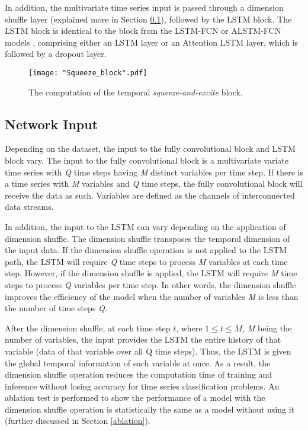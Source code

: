 \documentclass[preprint,12pt,3p]{elsarticle}
\begin{document}
In addition, the multivariate time series input is passed through a dimension shuffle layer (explained more in Section \ref{net_input}), followed by the LSTM block. The LSTM block is identical to the block from the LSTM-FCN or ALSTM-FCN models \cite{karim2017lstm}, comprising either an LSTM layer or an Attention LSTM layer, which is followed by a dropout layer. 

\begin{figure*}[htpb]
\center
\texttt{[image: "Squeeze\_block".pdf]}

\center
\caption{The computation of the temporal \textit{squeeze-and-excite} block.}
\label{fig:squeeze}

\end{figure*}







 



\subsection{Network Input}
\label{net_input}
Depending on the dataset, the input to the fully convolutional block and LSTM block vary. The input to the fully convolutional block is a multivariate variate time series with \textit{Q} time steps having \textit{M} distinct variables per time step. If there is a time series with \textit{M} variables and \textit{Q} time steps, the fully convolutional block will receive the data as such. Variables are defined as the channels of interconnected data streams.  

In addition, the input to the LSTM can vary depending on the application of dimension shuffle. The dimension shuffle transposes the temporal dimension of the input data. If the dimension shuffle operation is not applied to the LSTM path, the LSTM will require \textit{Q} time steps to process \textit{M} variables at each time step. However, if the dimension shuffle is applied, the LSTM will require \textit{M} time steps to process \textit{Q} variables per time step. In other words, the dimension shuffle improves the efficiency of the model when the number of variables \textit{M} is less than the number of time steps \textit{Q}. 


After the dimension shuffle, at each time step $t$, where $1 \leq t \leq M$, \textit{M} being the number of variables, the input provides the LSTM the entire history of that variable (data of that variable over all Q time steps). Thus, the LSTM is given the global temporal information of each variable at once. As a result, the dimension shuffle operation reduces the computation time of training and inference without losing accuracy for time series classification problems. An ablation test is performed to show the performance of a model with the dimension shuffle operation is statistically the same as a model without using it (further discussed in Section \ref{ablation}).
\end{document}
